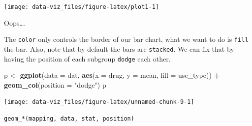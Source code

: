 \documentclass[]{book}
\newenvironment{Shaded}{\begin{snugshade}}{\end{snugshade}}
\newcommand{\DataTypeTok}[1]{\textcolor[rgb]{0.13,0.29,0.53}{#1}}
\newcommand{\KeywordTok}[1]{\textcolor[rgb]{0.13,0.29,0.53}{\textbf{#1}}}
\newcommand{\NormalTok}[1]{#1}
\newcommand{\OperatorTok}[1]{\textcolor[rgb]{0.81,0.36,0.00}{\textbf{#1}}}
\newcommand{\StringTok}[1]{\textcolor[rgb]{0.31,0.60,0.02}{#1}}
\theoremstyle{definition}
\theoremstyle{definition}
\theoremstyle{definition}
\theoremstyle{remark}
\begin{document}
\begin{center}\texttt{[image: data-viz\_files/figure-latex/plot1-1]} \end{center}

Oops\ldots{}.

The \texttt{color} only controls the border of our bar chart, what we
want to do is \texttt{fill} the bar. Also, note that by default the bars
are \texttt{stacked}. We can fix that by having the position of each
subgroup \texttt{dodge} each other.

\begin{Shaded}
\begin{Highlighting}[]
\NormalTok{p <-}\StringTok{ }\KeywordTok{ggplot}\NormalTok{(}\DataTypeTok{data =}\NormalTok{ dat, }\KeywordTok{aes}\NormalTok{(}\DataTypeTok{x =}\NormalTok{ drug, }\DataTypeTok{y =}\NormalTok{ mean, }\DataTypeTok{fill =}\NormalTok{ use_type)) }\OperatorTok{+}
\StringTok{  }\KeywordTok{geom_col}\NormalTok{(}\DataTypeTok{position =} \StringTok{"dodge"}\NormalTok{)}
\NormalTok{p}
\end{Highlighting}
\end{Shaded}

\begin{center}\texttt{[image: data-viz\_files/figure-latex/unnamed-chunk-9-1]} \end{center}

\texttt{geom\_*(mapping,\ data,\ stat,\ position)}
\end{document}
